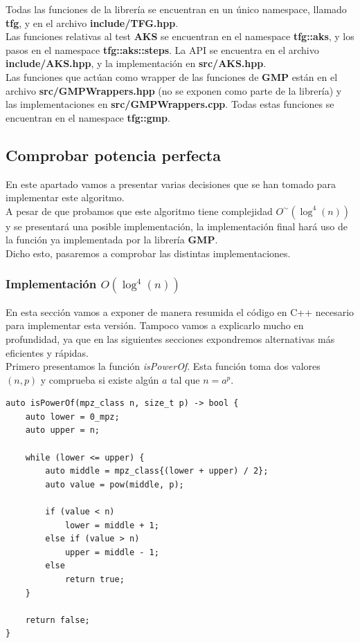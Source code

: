 Todas las funciones de la librería se encuentran en un único namespace, llamado \textbf{tfg}, y en el archivo \textbf{include/TFG.hpp}.\\

Las funciones relativas al test \textbf{AKS} se encuentran en el namespace \textbf{tfg::aks}, y los pasos en el namespace \textbf{tfg::aks::steps}. La API se encuentra en el archivo \textbf{include/AKS.hpp}, y la implementación en \textbf{src/AKS.hpp}.\\

Las funciones que actúan como wrapper de las funciones de \textbf{GMP} están en el archivo \textbf{src/GMPWrappers.hpp} (no se exponen como parte de la librería) y las implementaciones en \textbf{src/GMPWrappers.cpp}. Todas estas funciones se encuentran en el namespace \textbf{tfg::gmp}.

\subsection{Comprobar potencia perfecta}

En este apartado vamos a presentar varias decisiones que se han tomado para implementar este algoritmo.\\

A pesar de que probamos que este algoritmo tiene complejidad $O^\sim(\log^4(n))$ y se presentará una posible implementación, la implementación final hará uso de la función ya implementada por la librería \textbf{GMP}.\\

Dicho esto, pasaremos a comprobar las distintas implementaciones.

\subsubsection{Implementación $O(\log^4(n))$}

En esta sección vamos a exponer de manera resumida el código en C++ necesario para implementar esta versión. Tampoco vamos a explicarlo mucho en profundidad, ya que en las siguientes secciones expondremos alternativas más eficientes y rápidas.\\

Primero presentamos la función \textit{isPowerOf}. Esta función toma dos valores $(n, p)$ y comprueba si existe algún $a$ tal que $n = a^p$.\\

\begin{lstlisting}
auto isPowerOf(mpz_class n, size_t p) -> bool {
	auto lower = 0_mpz;
	auto upper = n;
	
	while (lower <= upper) {
		auto middle = mpz_class{(lower + upper) / 2};
		auto value = pow(middle, p);
	
		if (value < n)
			lower = middle + 1;
		else if (value > n)
			upper = middle - 1;
		else
			return true;
	}
	
	return false;
}
\end{lstlisting}

